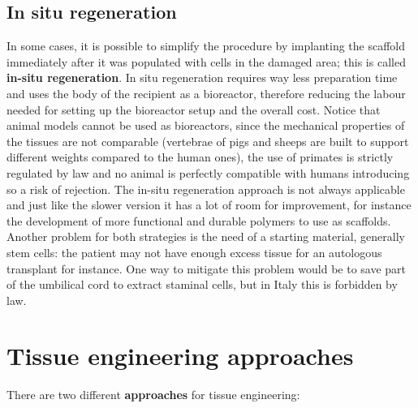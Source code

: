   \subsection{In situ regeneration}
  In some cases, it is possible to simplify the procedure by implanting the scaffold immediately after it was populated with cells in the damaged area; this is called \textbf{in-situ regeneration}.
  In situ regeneration requires way less preparation time and uses the body of the recipient as a bioreactor, therefore reducing the labour needed for setting up the bioreactor setup and the overall cost.
  Notice that animal models cannot be used as bioreactors, since the mechanical properties of the tissues are not comparable (vertebrae of pigs and sheeps are built to support different weights compared to the human ones), the use of primates is strictly regulated by law and no animal is perfectly compatible with humans introducing so a risk of rejection.
  The in-situ regeneration approach is not always applicable and just like the slower version it has a lot of room for improvement, for instance the development of more functional and durable polymers to use as scaffolds.
  Another problem for both strategies is the need of a starting material, generally stem cells: the patient may not have enough excess tissue for an autologous transplant for instance.
  One way to mitigate this problem would be to save part of the umbilical cord to extract staminal cells, but in Italy this is forbidden by law.

\section{Tissue engineering approaches}
There are two different \textbf{approaches} for tissue engineering:

